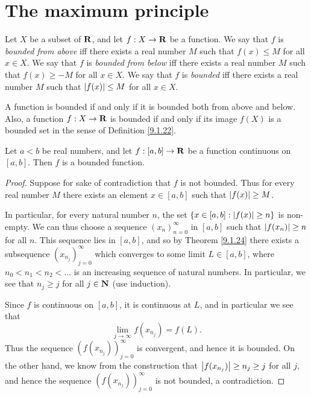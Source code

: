 \section{The maximum principle}\label{sec 9.6}

\begin{definition}\label{9.6.1}
    Let \(X\) be a subset of \(\mathbf{R}\), and let \(f : X \to \mathbf{R}\) be a function.
    We say that \(f\) is \emph{bounded from above} iff there exists a real number \(M\) such that \(f(x) \leq M\) for all \(x \in X\).
    We say that \(f\) is \emph{bounded from below} iff there exists a real number \(M\) such that \(f(x) \geq -M\) for all \(x \in X\).
    We say that \(f\) is \emph{bounded} iff there exists a real number \(M\) such that \(\left\lvert f(x)\right\rvert \leq M\) for all \(x \in X\).
\end{definition}

\begin{remark}\label{9.6.2}
    A function is bounded if and only if it is bounded both from above and below.
    Also, a function \(f : X \to \mathbf{R}\) is bounded if and only if its image \(f(X)\) is a bounded set in the sense of Definition \ref{9.1.22}.
\end{remark}

\begin{lemma}\label{9.6.3}
    Let \(a < b\) be real numbers, and let \(f : [a, b] \to \mathbf{R}\) be a function continuous on \([a, b]\).
    Then \(f\) is a bounded function.
\end{lemma}

\begin{proof}
    Suppose for sake of contradiction that \(f\) is not bounded.
    Thus for every real number \(M\) there exists an element \(x \in [a, b]\) such that \(\left\lvert f(x)\right\rvert \geq M\).

    In particular, for every natural number \(n\), the set \(\{x \in [a, b] : \left\lvert f(x)\right\rvert \geq n\}\) is non-empty.
    We can thus choose a sequence \((x_n)_{n = 0}^\infty\) in \([a, b]\) such that \(\left\lvert f(x_n)\right\rvert \geq n\) for all \(n\).
    This sequence lies in \([a, b]\), and so by Theorem \ref{9.1.24} there exists a subsequence \((x_{n_j})_{j = 0}^\infty\) which converges to some limit \(L \in [a, b]\), where \(n_0 < n_1 < n_2 < \dots\) is an increasing sequence of natural numbers.
    In particular, we see that \(n_j \geq j\) for all \(j \in \mathbf{N}\) (use induction).

    Since \(f\) is continuous on \([a, b]\), it is continuous at \(L\), and in particular we see that
    \[
        \lim_{j \to \infty} f(x_{n_j}) = f(L).
    \]
    Thus the sequence \((f(x_{n_j}))_{j = 0}^\infty\) is convergent, and hence it is bounded.
    On the other hand, we know from the construction that \(\left\lvert f(x_{n_j})\right\rvert \geq n_j \geq j\) for all \(j\), and hence the sequence \((f(x_{n_j}))_{j = 0}^\infty\) is not bounded, a contradiction.
\end{proof}

